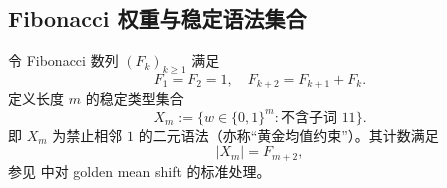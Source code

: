 \subsection{Fibonacci 权重与稳定语法集合}

令 Fibonacci 数列 $(F_k)_{k\ge1}$ 满足
\[
F_1=F_2=1,\quad F_{k+2}=F_{k+1}+F_k.
\]
定义长度 $m$ 的稳定类型集合
\[
X_m:=\{w\in\{0,1\}^m:\text{不含子词 }11\}.
\]
即 $X_m$ 为禁止相邻 $1$ 的二元语法（亦称“黄金均值约束”）。其计数满足
\[
|X_m|=F_{m+2},
\]
参见 \cite{LindMarcus1995} 中对 golden mean shift 的标准处理。
